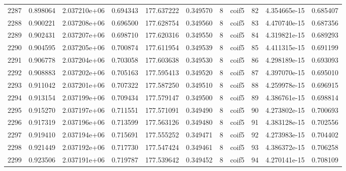 \begin{tabular}{lrrrrrrlrrr}
2287 &    0.898064 &        2.037210e+06 &  0.694343 &              177.637222 &    0.349570 &       8 &        coif5 &     82 &   4.354665e-15 &      0.685407 \\
2288 &    0.900221 &        2.037208e+06 &  0.696500 &              177.628754 &    0.349560 &       8 &        coif5 &     83 &   4.470740e-15 &      0.687356 \\
2289 &    0.902431 &        2.037207e+06 &  0.698710 &              177.620316 &    0.349550 &       8 &        coif5 &     84 &   4.319821e-15 &      0.689293 \\
2290 &    0.904595 &        2.037205e+06 &  0.700874 &              177.611954 &    0.349539 &       8 &        coif5 &     85 &   4.411315e-15 &      0.691199 \\
2291 &    0.906778 &        2.037204e+06 &  0.703058 &              177.603638 &    0.349530 &       8 &        coif5 &     86 &   4.298189e-15 &      0.693093 \\
2292 &    0.908883 &        2.037202e+06 &  0.705163 &              177.595413 &    0.349520 &       8 &        coif5 &     87 &   4.397070e-15 &      0.695010 \\
2293 &    0.911042 &        2.037201e+06 &  0.707322 &              177.587250 &    0.349510 &       8 &        coif5 &     88 &   4.259978e-15 &      0.696915 \\
2294 &    0.913154 &        2.037199e+06 &  0.709434 &              177.579147 &    0.349500 &       8 &        coif5 &     89 &   4.386761e-15 &      0.698814 \\
2295 &    0.915270 &        2.037197e+06 &  0.711551 &              177.571091 &    0.349490 &       8 &        coif5 &     90 &   4.273802e-15 &      0.700693 \\
2296 &    0.917319 &        2.037196e+06 &  0.713599 &              177.563126 &    0.349480 &       8 &        coif5 &     91 &   4.383128e-15 &      0.702556 \\
2297 &    0.919410 &        2.037194e+06 &  0.715691 &              177.555252 &    0.349471 &       8 &        coif5 &     92 &   4.273983e-15 &      0.704402 \\
2298 &    0.921449 &        2.037192e+06 &  0.717730 &              177.547424 &    0.349461 &       8 &        coif5 &     93 &   4.386372e-15 &      0.706258 \\
2299 &    0.923506 &        2.037191e+06 &  0.719787 &              177.539642 &    0.349452 &       8 &        coif5 &     94 &   4.270141e-15 &      0.708109 \\

\end{tabular}

